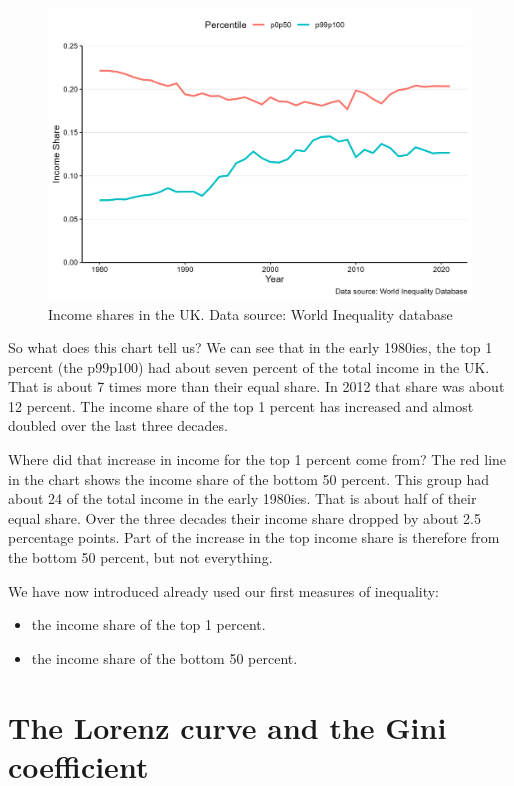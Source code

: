 \documentclass[
]{book}
\providecommand{\tightlist}{%
  \setlength{\itemsep}{0pt}\setlength{\parskip}{0pt}}
\begin{document}
\begin{figure}

{\centering \includegraphics[width=0.95\linewidth]{./resources/chapter_inequality/fig2} 

}

\caption{ Income shares in the UK. Data source: World Inequality database}\label{fig:inx2}
\end{figure}

So what does this chart tell us? We can see that in the early 1980ies, the top 1 percent (the p99p100) had about seven percent of the total income in the UK. That is about 7 times more than their equal share. In 2012 that share was about 12 percent. The income share of the top 1 percent has increased and almost doubled over the last three decades.

Where did that increase in income for the top 1 percent come from? The red line in the chart shows the income share of the bottom 50 percent. This group had about 24 of the total income in the early 1980ies. That is about half of their equal share. Over the three decades their income share dropped by about 2.5 percentage points. Part of the increase in the top income share is therefore from the bottom 50 percent, but not everything.

We have now introduced already used our first measures of inequality:

\begin{itemize}
\tightlist
\item
  the income share of the top 1 percent.
\item
  the income share of the bottom 50 percent.
\end{itemize}

\hypertarget{the-lorenz-curve-and-the-gini-coefficient}{%
\section{The Lorenz curve and the Gini coefficient}\label{the-lorenz-curve-and-the-gini-coefficient}}
\end{document}
